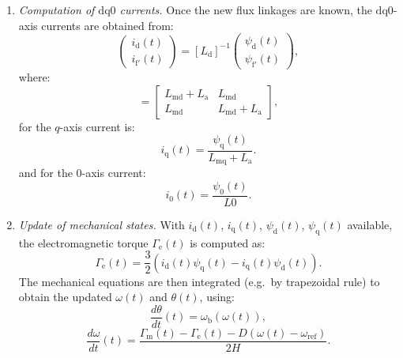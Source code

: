 \begin{enumerate}
    \item \textit{Computation of $\text{dq0}$ currents.}  
    Once the new flux linkages are known, the $\text{dq0}$-axis currents are obtained from:
    \begin{equation}
        \begin{pmatrix}
        i_\text{d}(t) \\
        i_{\text{f}'}(t) 
        \end{pmatrix}
        =
        [L_\text{d}]^{-1}
        \begin{pmatrix}
        \psi_\text{d}(t) \\
        \psi_{\text{f}'}(t)
        \end{pmatrix},
    \end{equation}
    where:
    \begin{equation}
        [L_\text{d}] =
        \begin{bmatrix}
        L_{\text{md}} + L_\text{a} & L_{\text{md}} \\[6pt]
        L_{\text{md}}       & L_{\text{md}} + L_\text{a}
        \end{bmatrix},
    \end{equation}
    for the $q$-axis current is:
    \begin{equation}
        i_\text{q}(t) = \frac{\psi_\text{q}(t)}{L_{\text{mq}} + L_\text{a}}.
    \end{equation}
    and for the 0-axis current:
    \begin{equation}
        i_\text{0}(t) = \frac{\psi_\text{0}(t)}{L0}.
    \end{equation}

    \item \textit{Update of mechanical states.}  
    With $i_\text{d}(t)$, $i_\text{q}(t)$, $\psi_\text{d}(t)$, $\psi_\text{q}(t)$ available, the electromagnetic torque $\Gamma_\text{e}(t)$ is computed as:
    \begin{equation}
        \Gamma_\text{e}(t) = \frac{3}{2} \left( i_\text{d}(t) \psi_\text{q}(t) - i_\text{q}(t) \psi_\text{d}(t) \right).
    \end{equation}
    The mechanical equations are then integrated (e.g.\ by trapezoidal rule) to obtain the updated $\omega(t)$ and $\theta(t)$, using:
    \begin{equation}
        \frac{d \theta}{dt}(t) = \omega_\text{b} (\omega(t)),
    \end{equation}
    \begin{equation}
        \frac{d \omega}{dt}(t) = \frac{\Gamma_\text{m}(t) - \Gamma_\text{e}(t) - D(\omega(t) - \omega_{\text{ref}})}{2 H}.
    \end{equation}


\end{enumerate}
